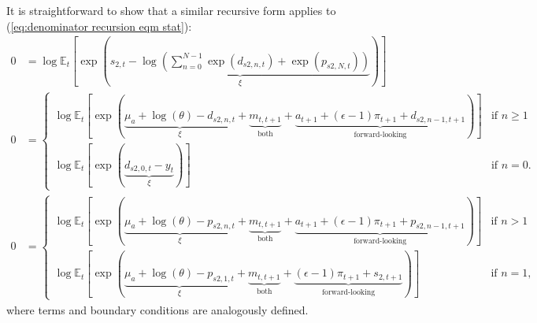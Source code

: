 \documentclass[12 pt, oneside]{article}
\theoremstyle{definition}
\theoremstyle{definition}
\theoremstyle{definition}
\newcommand{\E}{\mathbb{E}}
\begin{document}
It is straightforward to show that a similar recursive form applies to (\ref{eq:denominator recursion eqm stat}):
\begin{align}
  0 & = \log\E_t\left[\exp\left(\underbrace{s_{2, t} - \log\left(\sum_{n = 0}^{N - 1}\exp(d_{s2, n, t}) + \exp(p_{s2, N, t})\right)}_{\xi}\right)\right]\\
  0 & =
      \begin{cases}
        \log\E_t\left[\exp\left(\underbrace{\mu_a + \log(\theta) - d_{s2, n, t}}_{\xi} + \underbrace{m_{t, t + 1}}_{\text{both}} + \underbrace{a_{t + 1} + (\epsilon - 1) \pi_{t + 1} + d_{s2, n - 1, t + 1}}_{\text{forward-looking}}\right)\right] & \text{if } n \geq 1\\
        \log\E_t\left[\exp\left(\underbrace{d_{s2, 0, t} - y_t}_{\xi}\right)\right] & \text{if } n = 0.
      \end{cases}\\
  0 & =
      \begin{cases}
        \log\E_t\left[\exp\left(\underbrace{\mu_a + \log(\theta) - p_{s2, n, t}}_{\xi} + \underbrace{m_{t, t + 1}}_{\text{both}} + \underbrace{a_{t + 1} + (\epsilon - 1) \pi_{t + 1} + p_{s2, n - 1, t + 1}}_{\text{forward-looking}} \right)\right] & \text{if } n > 1\\
        \log\E_t\left[\exp\left(\underbrace{\mu_a + \log(\theta) - p_{s2, 1, t}}_{\xi} + \underbrace{m_{t, t + 1}}_{\text{both}} + \underbrace{(\epsilon - 1)\pi_{t + 1} + s_{2, t + 1}}_{\text{forward-looking}}\right)\right] & \text{if } n = 1,
      \end{cases}
\end{align}
where terms and boundary conditions are analogously defined.
\end{document}
